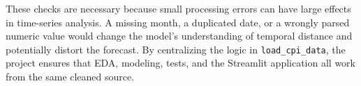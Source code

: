 These checks are necessary because small processing errors can have large effects in time-series analysis. A missing month, a duplicated date, or a wrongly parsed numeric value would change the model's understanding of temporal distance and potentially distort the forecast. By centralizing the logic in \texttt{load\_cpi\_data}, the project ensures that EDA, modeling, tests, and the Streamlit application all work from the same cleaned source.
